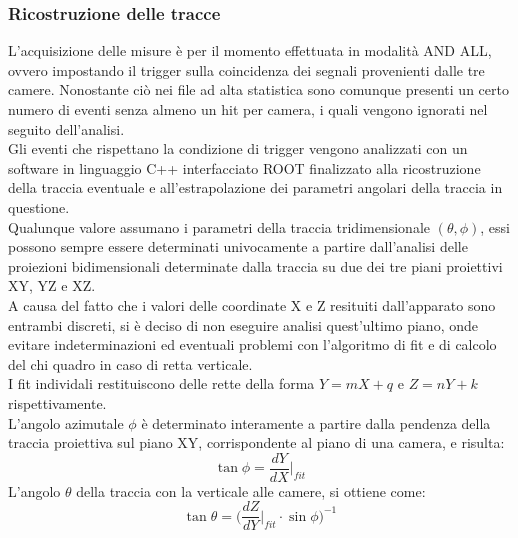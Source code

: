 \documentclass[8pt]{extarticle}
\begin{document}
\subsubsection{Ricostruzione delle tracce} \label{subsub:algoritmo}
L’acquisizione delle misure è per il momento effettuata in modalità AND ALL, ovvero impostando il trigger sulla coincidenza dei segnali provenienti dalle tre camere. Nonostante ciò nei file ad alta statistica sono comunque presenti un certo numero di eventi senza almeno un hit per camera, i quali vengono ignorati nel seguito dell’analisi.\\
Gli eventi che rispettano la condizione di trigger vengono analizzati con un software in linguaggio C++ interfacciato ROOT finalizzato alla ricostruzione della traccia eventuale e all’estrapolazione dei parametri angolari della traccia in questione.\\

Qualunque valore assumano i parametri della traccia tridimensionale $(\theta, \phi)$, essi possono sempre essere determinati univocamente a partire dall'analisi delle proiezioni bidimensionali determinate dalla traccia su due dei tre piani proiettivi XY, YZ e XZ. \\
A causa del fatto che i valori delle coordinate X e Z resituiti dall'apparato sono entrambi discreti, si è deciso di non eseguire analisi quest’ultimo piano, onde evitare indeterminazioni ed eventuali problemi con l'algoritmo di fit e di calcolo del chi quadro in caso di retta verticale.\\
I fit individali restituiscono delle rette della forma $Y=mX+q$ e $Z=nY+k$ rispettivamente.
\\
L'angolo azimutale $\phi$ è determinato interamente a partire dalla pendenza della traccia proiettiva sul piano XY, corrispondente al piano di una camera, e risulta:\[\tan{\phi}=\frac{dY}{dX}\biggr\rvert_{fit}\]
L'angolo $\theta$ della traccia con la verticale alle camere, si ottiene come:
\begin{equation}
\tan{\theta}=\Bigg(\frac{dZ}{dY}\biggr\rvert_{fit}\!\!\!\cdot \sin{\phi}\Bigg)^{-1}
\end{equation}
\end{document}
